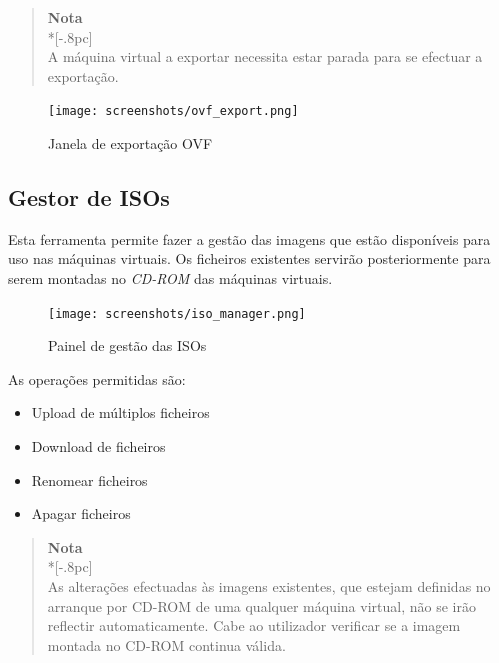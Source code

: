 \begin{quote}
	{\large \bf Nota} \\*[-.8pc]
	\underline{\hspace{6in}} \\
	A máquina virtual a exportar necessita estar parada para se efectuar a exportação.
\end{quote}

\begin{figure}[H]
	\begin{center}
	\texttt{[image: screenshots/ovf\_export.png]}
	\caption{Janela de exportação OVF}
	\label{fig:ovf_export}
	\end{center}
\end{figure}


\subsection{Gestor de ISOs}
\label{sec:iso_manager}
Esta ferramenta permite fazer a gestão das imagens que estão disponíveis para uso nas máquinas virtuais.
Os ficheiros existentes servirão posteriormente para serem montadas no \emph{CD-ROM} das máquinas virtuais.

\begin{figure}[H]
	\begin{center}
	\texttt{[image: screenshots/iso\_manager.png]}
	\caption{Painel de gestão das ISOs}
	\label{fig:iso_manager}
	\end{center}
\end{figure}

As operações permitidas são:
\begin{itemize}
\item Upload de múltiplos ficheiros
\item Download de ficheiros
\item Renomear ficheiros
\item Apagar ficheiros
\end{itemize}


\begin{quote}
	{\large \bf Nota} \\*[-.8pc]
	\underline{\hspace{6in}} \\
	As alterações efectuadas às imagens existentes, que estejam definidas no arranque por CD-ROM de uma qualquer máquina virtual,
     não se irão reflectir automaticamente. Cabe ao utilizador verificar se a imagem montada no CD-ROM continua válida.
\end{quote}

